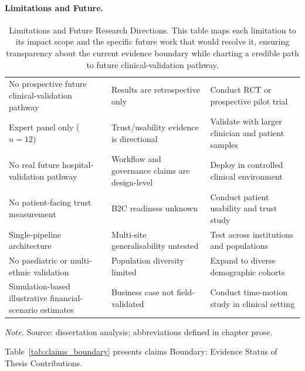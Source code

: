 \paragraph{Limitations and Future.}






{\tablestripes\tablefontsize
{}
\begin{xltabular}{\textwidth}{@{} l L L @{}}
\caption[Limitations and Future Research Directions]{Limitations and Future Research Directions. This table maps each limitation to its impact scope and the specific future work that would resolve it, ensuring transparency about the current evidence boundary while charting a credible path to future clinical-validation pathway.}\label{tab:limitations_future} \\
\toprule
{} &  &  \\
\midrule
\endfirsthead
\endhead
\bottomrule
\endlastfoot
No prospective future clinical-validation pathway & Results are retrospective only & Conduct RCT or prospective pilot trial \\
Expert panel only ($n = 12$) & Trust/usability evidence is directional & Validate with larger clinician and patient samples \\
No real future hospital-validation pathway & Workflow and governance claims are design-level & Deploy in controlled clinical environment \\
No patient-facing trust measurement & B2C readiness unknown & Conduct patient usability and trust study \\
Single-pipeline architecture & Multi-site generalisability untested & Test across institutions and populations \\
No paediatric or multi-ethnic validation & Population diversity limited & Expand to diverse demographic cohorts \\
Simulation-based illustrative financial-scenario estimates & Business case not field-validated & Conduct time-motion study in clinical setting \\
\end{xltabular}}
\vspace{0.3em}\noindent\textit{Note.} Source: dissertation analysis; abbreviations defined in chapter prose.

\noindent Table~\ref{tab:claims_boundary} presents claims Boundary: Evidence Status of Thesis Contributions.


